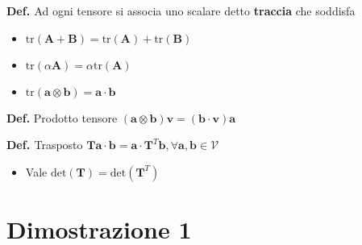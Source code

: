 \documentclass[10pt,a4paper,twoside]{book}
\begin{document}
\textbf{\textcolor[rgb]{0.82,0.01,0.11}{Def. }}Ad ogni tensore si associa uno scalare detto \textbf{\textcolor[rgb]{0.82,0.01,0.11}{traccia}} che soddisfa
\begin{itemize}
\item $\mathrm{tr}(\mathbf{A} +\mathbf{B}) =\mathrm{tr}(\mathbf{A}) +\mathrm{tr}(\mathbf{B})$
\item $\mathrm{tr}( \alpha \mathbf{A}) =\alpha \mathrm{tr}(\mathbf{A})$
\item $\mathrm{tr}(\mathbf{a} \otimes \mathbf{b}) =\mathbf{a} \cdotp \mathbf{b}$
\end{itemize}

\textbf{\textcolor[rgb]{0.82,0.01,0.11}{Def.}}\textcolor[rgb]{0,0,0}{ Prodotto tensore} $(\mathbf{a} \otimes \mathbf{b})\mathbf{v} =(\mathbf{b} \cdotp \mathbf{v})\mathbf{a}$

\textbf{\textcolor[rgb]{0.82,0.01,0.11}{Def. }}Trasposto $\mathbf{Ta} \cdotp \mathbf{b} =\mathbf{a} \cdotp \mathbf{T}^{T}\mathbf{b} ,\forall \mathbf{a} ,\mathbf{b} \in \mathcal{V}$
\begin{itemize}
\item Vale $\mathrm{det}(\mathbf{T}) =\mathrm{det}\left(\mathbf{T}^{T}\right)$
\end{itemize}
\section{Dimostrazione 1}
\end{document}
